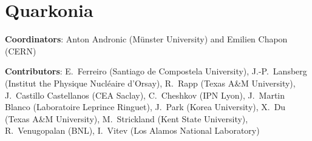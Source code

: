 \documentclass[../report.tex]{subfiles}
\begin{document}
\section{Quarkonia}

\label{sec:quarkonia}

{ \small
\noindent \textbf{Coordinators}: Anton Andronic (M\"{u}nster University) and Emilien Chapon (CERN)

\noindent \textbf{Contributors}: 
E.~Ferreiro (Santiago de Compostela University), 
J.-P.~Lansberg (Institut the Physique Nucl\'{e}aire d'Orsay), 
R.~Rapp (Texas A\&M University),
J.~Castillo Castellanos (CEA Saclay),
C.~Cheshkov (IPN Lyon),
J.~Martin Blanco (Laboratoire Leprince Ringuet),
J.~Park (Korea University), 
X.~Du (Texas A\&M University),
M.~Strickland (Kent State University), 
R.~Venugopalan (BNL), 
I.~Vitev (Los Alamos National Laboratory)
}



\end{document}
